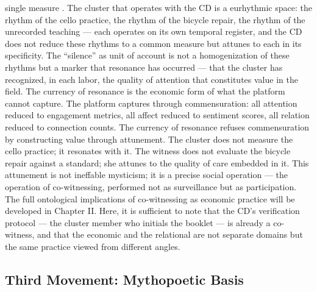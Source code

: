 single measure \cite{lefebvre_2004}. The cluster that operates with the CD is a eurhythmic space: the rhythm of the cello practice, the rhythm of the bicycle repair, the rhythm of the unrecorded teaching — each operates on its own temporal register, and the CD does not reduce these rhythms to a common measure but attunes to each in its specificity. The “silence” as unit of account is not a homogenization of these rhythms but a marker that resonance has occurred — that the cluster has recognized, in each labor, the quality of attention that constitutes value in the field. The currency of resonance is the economic form of what the platform cannot capture. The platform captures through commensuration: all attention reduced to engagement metrics, all affect reduced to sentiment scores, all relation reduced to connection counts. The currency of resonance refuses commensuration by constructing value through attunement. The cluster does not measure the cello practice; it resonates with it. The witness does not evaluate the bicycle repair against a standard; she attunes to the quality of care embedded in it. This attunement is not ineffable mysticism; it is a precise social operation — the operation of co-witnessing, performed not as surveillance but as participation. The full ontological implications of co-witnessing as economic practice will be developed in Chapter II. Here, it is sufficient to note that the CD’s verification protocol — the cluster member who initials the booklet — is already a co-witness, and that the economic and the relational are not separate domains but the same practice viewed from different angles.

\subsection{Third Movement: Mythopoetic Basis}

